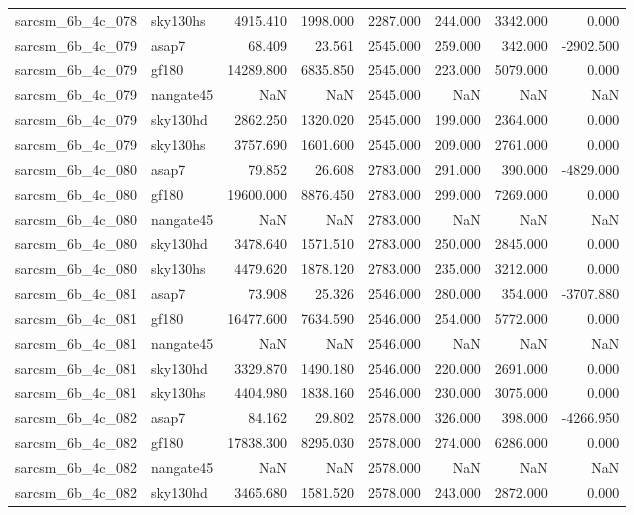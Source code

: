 \begin{tabular}{llrrrrrr}
sarcsm\_6b\_4c\_078 & sky130hs & 4915.410 & 1998.000 & 2287.000 & 244.000 & 3342.000 & 0.000 \\
sarcsm\_6b\_4c\_079 & asap7 & 68.409 & 23.561 & 2545.000 & 259.000 & 342.000 & -2902.500 \\
sarcsm\_6b\_4c\_079 & gf180 & 14289.800 & 6835.850 & 2545.000 & 223.000 & 5079.000 & 0.000 \\
sarcsm\_6b\_4c\_079 & nangate45 & NaN & NaN & 2545.000 & NaN & NaN & NaN \\
sarcsm\_6b\_4c\_079 & sky130hd & 2862.250 & 1320.020 & 2545.000 & 199.000 & 2364.000 & 0.000 \\
sarcsm\_6b\_4c\_079 & sky130hs & 3757.690 & 1601.600 & 2545.000 & 209.000 & 2761.000 & 0.000 \\
sarcsm\_6b\_4c\_080 & asap7 & 79.852 & 26.608 & 2783.000 & 291.000 & 390.000 & -4829.000 \\
sarcsm\_6b\_4c\_080 & gf180 & 19600.000 & 8876.450 & 2783.000 & 299.000 & 7269.000 & 0.000 \\
sarcsm\_6b\_4c\_080 & nangate45 & NaN & NaN & 2783.000 & NaN & NaN & NaN \\
sarcsm\_6b\_4c\_080 & sky130hd & 3478.640 & 1571.510 & 2783.000 & 250.000 & 2845.000 & 0.000 \\
sarcsm\_6b\_4c\_080 & sky130hs & 4479.620 & 1878.120 & 2783.000 & 235.000 & 3212.000 & 0.000 \\
sarcsm\_6b\_4c\_081 & asap7 & 73.908 & 25.326 & 2546.000 & 280.000 & 354.000 & -3707.880 \\
sarcsm\_6b\_4c\_081 & gf180 & 16477.600 & 7634.590 & 2546.000 & 254.000 & 5772.000 & 0.000 \\
sarcsm\_6b\_4c\_081 & nangate45 & NaN & NaN & 2546.000 & NaN & NaN & NaN \\
sarcsm\_6b\_4c\_081 & sky130hd & 3329.870 & 1490.180 & 2546.000 & 220.000 & 2691.000 & 0.000 \\
sarcsm\_6b\_4c\_081 & sky130hs & 4404.980 & 1838.160 & 2546.000 & 230.000 & 3075.000 & 0.000 \\
sarcsm\_6b\_4c\_082 & asap7 & 84.162 & 29.802 & 2578.000 & 326.000 & 398.000 & -4266.950 \\
sarcsm\_6b\_4c\_082 & gf180 & 17838.300 & 8295.030 & 2578.000 & 274.000 & 6286.000 & 0.000 \\
sarcsm\_6b\_4c\_082 & nangate45 & NaN & NaN & 2578.000 & NaN & NaN & NaN \\
sarcsm\_6b\_4c\_082 & sky130hd & 3465.680 & 1581.520 & 2578.000 & 243.000 & 2872.000 & 0.000 \\

\end{tabular}
